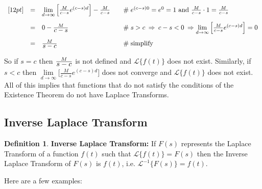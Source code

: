 \documentclass{article}
\theoremstyle{definition}
\newtheorem{definition}{Definition}[section]
\begin{document}
\begin{equation*}
\begin{array}{lllll}
[12pt]                                                                                %
&=& \lim\limits_{d \to \infty}\Big [\frac{M}{c-s} e^{(c-s)d} \Big ] - \frac{M}{c - s}                 &\quad  \mathrel{\#} e^{(c-s)0} = e^0 = 1 \text{ and } \frac{M}{c-s} \cdot 1 = \frac{M}{c-s}                                   \\
[12pt]                                                                                %
&=& 0 - \frac{M} {\mathlarger{c-s}}                                   &\quad  \mathrel{\#} s > c \: \Rightarrow \: c -s < 0 \: \Rightarrow  \lim\limits_{d \to \infty}\Big [\frac{M}{c-s} e^{(c-s)d} \Big ] = 0                        \\    
[12pt]                                                                                %
&=& \frac{M}{\mathlarger{s-c}}                                         &\quad  \mathrel{\#} \text{simplify} 
\end{array}
\end{equation*}

\bigskip
\noindent
So if $s = c$ then $\frac{M}{\mathlarger{s-c}}$ is not defined and $\mathcal{L}\{f(t)\}$ does not exist. Similarly, if $s < c$ then $\lim\limits_{d \to \infty}\Big [\frac{M}{c-s} e^{(c-s)d} \Big ]$ 
does not converge and $\mathcal{L}\{f(t)\}$ does not exist. All of this implies that functions that do not satisfy the conditions of the Existence Theorem do not have Laplace Transforms.

\subsection{Inverse Laplace Transform}

\begin{definition} {\bf Inverse Laplace Transform:}
If $F(s)$ represents the Laplace Transform of a function $f(t)$ such that $\mathcal{L}\{f(t)\} = F(s)$
then the Inverse Laplace Transform of $F(s)$ is $f(t)$, i.e. $\mathcal{L}^{-1}\{F(s)\} = f(t)$.
\end{definition}

\bigskip
\noindent
Here are a few examples:

\bigskip
\end{document}
